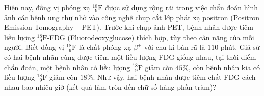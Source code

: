 	\begin{ex}%
		Hiện nay, đồng vị phóng xạ ${}^{18}_{\phantom{1}9}\text{F}$ được sử dụng rộng rãi trong việc chẩn đoán hình ảnh các bệnh ung thư nhờ vào công nghệ chụp cắt lớp phát xạ positron (Positron Emission Tomography -- PET). Trước khi chụp ảnh PET, bệnh nhân được tiêm liều lượng ${}^{18}_{\phantom{1}9}\text{F}$-FDG (Fluorodeoxyglucose) thích hợp, tùy theo cân nặng của mỗi người. Biết đồng vị ${}^{18}_{\phantom{1}9}\text{F}$ là chất phóng xạ $\beta^+$ với chu kì bán rã là $110$ phút. Giả sử có hai bệnh nhân cùng được tiêm một liều lượng FDG giống nhau, tại thời điểm chẩn đoán, một bệnh nhân có liều lượng ${}^{18}_{\phantom{1}9}\text{F}$ giảm còn $45\%$, còn bệnh nhân kia có liều lượng ${}^{18}_{\phantom{1}9}\text{F}$ giảm còn $18\%$. Như vậy, hai bệnh nhân được tiêm chất FDG cách nhau bao nhiêu giờ (kết quả làm tròn đến chữ số hàng phần trăm)?
		\par
	\end{ex}

